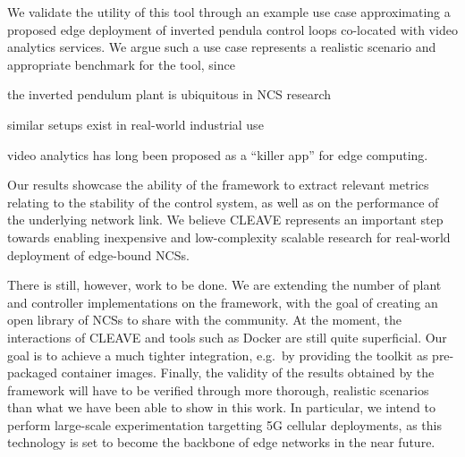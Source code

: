 We validate the utility of this tool through an example use case approximating a proposed edge deployment of inverted pendula control loops co-located with video analytics services.
We argue such a use case represents a realistic scenario and appropriate benchmark for the tool, since
\begin{enumerate*}[itemjoin={{; }}, itemjoin*={{; and }}]
    \item the inverted pendulum plant is ubiquitous in \gls{NCS} research
    \item similar setups exist in real-world industrial use
    \item video analytics has long been proposed as a ``killer app'' for edge computing.
\end{enumerate*}
Our results showcase the ability of the framework to extract relevant metrics relating to the stability of the control system, as well as on the performance of the underlying network link.
We believe \gls{CLEAVE} represents an important step towards enabling inexpensive and low-complexity scalable research for real-world deployment of edge-bound \acp{NCS}.

There is still, however, work to be done.
We are extending the number of plant and controller implementations on the framework, with the goal of creating an open library of \acp{NCS} to share with the community.
At the moment, the interactions of \gls{CLEAVE} and tools such as Docker are still quite superficial.
Our goal is to achieve a much tighter integration, e.g.\ by providing the toolkit as pre-packaged container images.
Finally, the validity of the results obtained by the framework will have to be verified through more thorough, realistic scenarios than what we have been able to show in this work.
In particular, we intend to perform large-scale experimentation targetting 5G cellular deployments, as this technology is set to become the backbone of edge networks in the near future.
